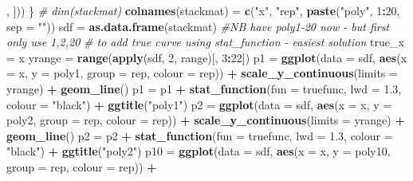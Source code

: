 \documentclass[]{article}
\newenvironment{Shaded}{\begin{snugshade}}{\end{snugshade}}
\newcommand{\KeywordTok}[1]{\textcolor[rgb]{0.13,0.29,0.53}{\textbf{#1}}}
\newcommand{\DataTypeTok}[1]{\textcolor[rgb]{0.13,0.29,0.53}{#1}}
\newcommand{\DecValTok}[1]{\textcolor[rgb]{0.00,0.00,0.81}{#1}}
\newcommand{\FloatTok}[1]{\textcolor[rgb]{0.00,0.00,0.81}{#1}}
\newcommand{\StringTok}[1]{\textcolor[rgb]{0.31,0.60,0.02}{#1}}
\newcommand{\CommentTok}[1]{\textcolor[rgb]{0.56,0.35,0.01}{\textit{#1}}}
\newcommand{\OperatorTok}[1]{\textcolor[rgb]{0.81,0.36,0.00}{\textbf{#1}}}
\newcommand{\NormalTok}[1]{#1}
\begin{document}
\begin{Shaded}
\begin{Highlighting}[]
\NormalTok{        , ]))}
\NormalTok{\}}
\CommentTok{# dim(stackmat)}
\KeywordTok{colnames}\NormalTok{(stackmat) =}\StringTok{ }\KeywordTok{c}\NormalTok{(}\StringTok{"x"}\NormalTok{, }\StringTok{"rep"}\NormalTok{, }\KeywordTok{paste}\NormalTok{(}\StringTok{"poly"}\NormalTok{, }\DecValTok{1}\OperatorTok{:}\DecValTok{20}\NormalTok{, }\DataTypeTok{sep =} \StringTok{""}\NormalTok{))}
\NormalTok{sdf =}\StringTok{ }\KeywordTok{as.data.frame}\NormalTok{(stackmat)  }\CommentTok{#NB have poly1-20 now - but first only use 1,2,20}
\CommentTok{# to add true curve using stat_function - easiest solution}
\NormalTok{true_x =}\StringTok{ }\NormalTok{x}
\NormalTok{yrange =}\StringTok{ }\KeywordTok{range}\NormalTok{(}\KeywordTok{apply}\NormalTok{(sdf, }\DecValTok{2}\NormalTok{, range)[, }\DecValTok{3}\OperatorTok{:}\DecValTok{22}\NormalTok{])}
\NormalTok{p1 =}\StringTok{ }\KeywordTok{ggplot}\NormalTok{(}\DataTypeTok{data =}\NormalTok{ sdf, }\KeywordTok{aes}\NormalTok{(}\DataTypeTok{x =}\NormalTok{ x, }\DataTypeTok{y =}\NormalTok{ poly1, }\DataTypeTok{group =}\NormalTok{ rep, }\DataTypeTok{colour =}\NormalTok{ rep)) }\OperatorTok{+}\StringTok{ }
\StringTok{    }\KeywordTok{scale_y_continuous}\NormalTok{(}\DataTypeTok{limits =}\NormalTok{ yrange) }\OperatorTok{+}\StringTok{ }\KeywordTok{geom_line}\NormalTok{()}
\NormalTok{p1 =}\StringTok{ }\NormalTok{p1 }\OperatorTok{+}\StringTok{ }\KeywordTok{stat_function}\NormalTok{(}\DataTypeTok{fun =}\NormalTok{ truefunc, }\DataTypeTok{lwd =} \FloatTok{1.3}\NormalTok{, }\DataTypeTok{colour =} \StringTok{"black"}\NormalTok{) }\OperatorTok{+}\StringTok{ }
\StringTok{    }\KeywordTok{ggtitle}\NormalTok{(}\StringTok{"poly1"}\NormalTok{)}
\NormalTok{p2 =}\StringTok{ }\KeywordTok{ggplot}\NormalTok{(}\DataTypeTok{data =}\NormalTok{ sdf, }\KeywordTok{aes}\NormalTok{(}\DataTypeTok{x =}\NormalTok{ x, }\DataTypeTok{y =}\NormalTok{ poly2, }\DataTypeTok{group =}\NormalTok{ rep, }\DataTypeTok{colour =}\NormalTok{ rep)) }\OperatorTok{+}\StringTok{ }
\StringTok{    }\KeywordTok{scale_y_continuous}\NormalTok{(}\DataTypeTok{limits =}\NormalTok{ yrange) }\OperatorTok{+}\StringTok{ }\KeywordTok{geom_line}\NormalTok{()}
\NormalTok{p2 =}\StringTok{ }\NormalTok{p2 }\OperatorTok{+}\StringTok{ }\KeywordTok{stat_function}\NormalTok{(}\DataTypeTok{fun =}\NormalTok{ truefunc, }\DataTypeTok{lwd =} \FloatTok{1.3}\NormalTok{, }\DataTypeTok{colour =} \StringTok{"black"}\NormalTok{) }\OperatorTok{+}\StringTok{ }
\StringTok{    }\KeywordTok{ggtitle}\NormalTok{(}\StringTok{"poly2"}\NormalTok{)}
\NormalTok{p10 =}\StringTok{ }\KeywordTok{ggplot}\NormalTok{(}\DataTypeTok{data =}\NormalTok{ sdf, }\KeywordTok{aes}\NormalTok{(}\DataTypeTok{x =}\NormalTok{ x, }\DataTypeTok{y =}\NormalTok{ poly10, }\DataTypeTok{group =}\NormalTok{ rep, }\DataTypeTok{colour =}\NormalTok{ rep)) }\OperatorTok{+}\StringTok{ }

\end{Highlighting}
\end{Shaded}
\end{document}
